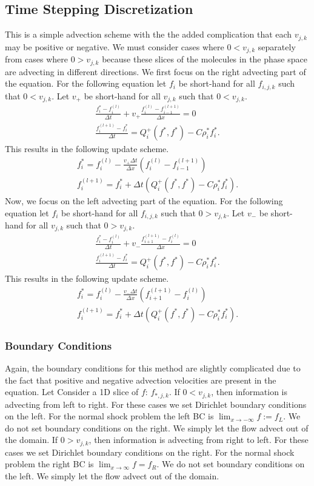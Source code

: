 \documentclass{article}
\begin{document}
\subsection{Time Stepping Discretization}
This is a simple advection scheme with the the added complication that each $v_{j,k}$ may be positive or negative. We must consider cases where $0 < v_{j,k}$ separately from cases where $0 > v_{j,k}$ because these slices of the molecules in the phase space are advecting in different directions. We first focus on the right advecting part of the equation. For the following equation let $f_i$ be short-hand for all $f_{i,j,k}$ such that $0 < v_{j,k}$. Let $v_+$ be short-hand for all $v_{j,k}$ such that $0 < v_{j,k}$.
\begin{gather*}
  \frac{f_i^* - f_i^{(l)}}{\Delta t} + v_+ \frac{f_i^{(l)} - f_{i-1}^{(l+1)}}{\Delta x} = 0\\
  \frac{f_i^{(l+1)} - f^*_i}{\Delta t} = Q_i^+(f^*,f^*) - C \rho_i^* f^*_i.
\end{gather*}
This results in the following update scheme.
\begin{gather*}
  f_i^* = f_i^{(l)} - \frac{v_+ \Delta t}{\Delta x} \left( f_i^{(l)} - f_{i-1}^{(l+1)} \right)\\
  f_i^{(l+1)} = f^*_i + \Delta t \left( Q_i^+(f^*,f^*) - C \rho_i^* f^*_i \right).
\end{gather*}
Now, we focus on the left advecting part of the equation. For the following equation let $f_i$ be short-hand for all $f_{i,j,k}$ such that $0 > v_{j,k}$. Let $v_-$ be short-hand for all $v_{j,k}$ such that $0 > v_{j,k}$.
\begin{gather*}
  \frac{f_i^* - f_i^{(l)}}{\Delta t} + v_- \frac{f_{i+1}^{(l+1)} - f_{i}^{(l)}}{\Delta x} = 0\\
  \frac{f_i^{(l+1)} - f^*_i}{\Delta t} = Q_i^+(f^*,f^*) - C \rho_i^* f^*_i.
\end{gather*}
This results in the following update scheme.
\begin{gather*}
  f_i^* = f_i^{(l)} - \frac{v_- \Delta t}{\Delta x} \left( f_{i+1}^{(l+1)} - f_{i}^{(l)} \right)\\
  f_i^{(l+1)} = f^*_i + \Delta t \left( Q_i^+(f^*,f^*) - C \rho_i^* f^*_i \right).
\end{gather*}
\subsubsection{Boundary Conditions}
Again, the boundary conditions for this method are slightly complicated due to the fact that positive and negative advection velocities are present in the equation. Let Consider a 1D slice of $f$: $f_{*,j,k}$. If $0 < v_{j,k}$, then information is advecting from left to right. For these cases we set Dirichlet boundary conditions on the left. For the normal shock problem the left BC is $\lim_{x \to -\infty} f := f_L$. We do not set boundary conditions on the right. We simply let the flow advect out of the domain. If $0 > v_{j,k}$, then information is advecting from right to left. For these cases we set Dirichlet boundary conditions on the right. For the normal shock problem the right BC is $\lim_{x \to \infty} f = f_R$. We do not set boundary conditions on the left. We simply let the flow advect out of the domain.
\end{document}
